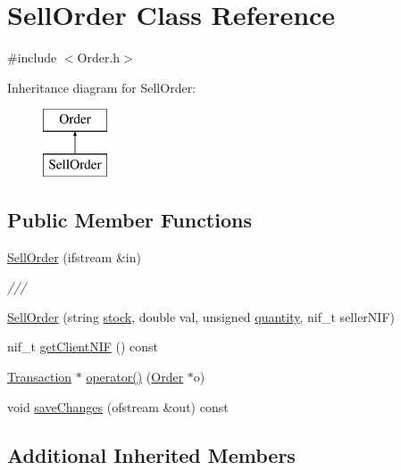 \hypertarget{class_sell_order}{}\section{Sell\+Order Class Reference}
\label{class_sell_order}


{\ttfamily \#include $<$Order.\+h$>$}

Inheritance diagram for Sell\+Order\+:\begin{figure}[H]
\begin{center}
\leavevmode
\includegraphics[height=2.000000cm]{class_sell_order}
\end{center}
\end{figure}
\subsection*{Public Member Functions}
\begin{DoxyCompactItemize}
\item 
\hyperlink{class_sell_order_ac89fdde112f2f9aac52633a2d9507bea}{Sell\+Order} (ifstream \&in)
\begin{DoxyCompactList}\small\item\em /// \end{DoxyCompactList}\item 
\hyperlink{class_sell_order_a19145616a9cceec182bdcb00816b89c5}{Sell\+Order} (string \hyperlink{class_order_aafb6dfab2a1c253eefd78840b27dcd2e}{stock}, double val, unsigned \hyperlink{class_order_ab02e2baeb8c57217a20c9124df3ba11d}{quantity}, nif\+\_\+t seller\+N\+IF)
\item 
nif\+\_\+t \hyperlink{class_sell_order_a2f34e30d8bc5c891c40d8b80342cc34d}{get\+Client\+N\+IF} () const
\item 
\hyperlink{class_transaction}{Transaction} $\ast$ \hyperlink{class_sell_order_ae4e19807431bcd87c7126d0c644ff209}{operator()} (\hyperlink{class_order}{Order} $\ast$o)
\item 
void \hyperlink{class_sell_order_a81c6ea39652c38a718803c036767787f}{save\+Changes} (ofstream \&out) const
\end{DoxyCompactItemize}
\subsection*{Additional Inherited Members}


